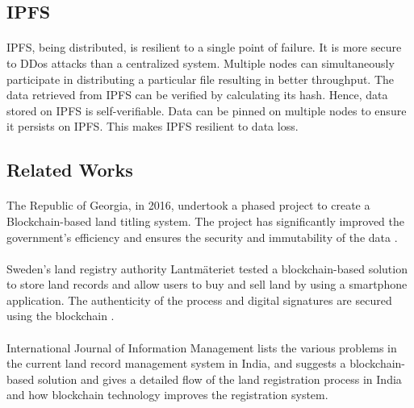 \documentclass{article}
\begin{document}
    \subsection{IPFS}
        \paragraph{}
        IPFS, being distributed, is resilient to a single point of failure. It is more secure to DDos attacks than a centralized system. Multiple nodes can simultaneously participate in distributing a particular file resulting in better throughput. The data retrieved from IPFS can be verified by calculating its hash. Hence, data stored on IPFS is self-verifiable. Data can be pinned on multiple nodes to ensure it persists on IPFS. This makes IPFS resilient to data loss.

    \subsection{Related Works}
        \paragraph{}
        The Republic of Georgia, in 2016, undertook a phased project to create a Blockchain-based land titling system. The project has significantly improved the government’s efficiency and ensures the security and immutability of the data \cite{10.1162/inov_a_00276}.

        \paragraph{}
        Sweden’s land registry authority Lantmäteriet tested a blockchain-based solution to store land records and allow users to buy and sell land by using a smartphone application. The authenticity of the process and digital signatures are secured using the blockchain \cite{sweden}.
        
        \paragraph{}
        International Journal of Information Management \cite{THAKUR2020101940} lists the various problems in the current land record management system in India, and suggests a blockchain-based solution and gives a detailed flow of the land registration process in India and how blockchain technology improves the registration system.
\end{document}
